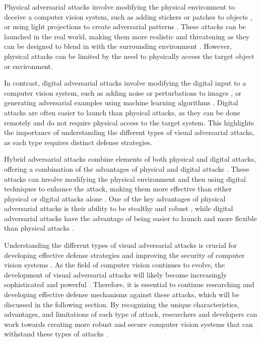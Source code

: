 \documentclass[11pt]{article}
\begin{document}
Physical adversarial attacks involve modifying the physical environment to deceive a computer vision system, such as adding stickers or patches to objects \cite{ref7}, or using light projections to create adversarial patterns \cite{ref8}. These attacks can be launched in the real world, making them more realistic and threatening as they can be designed to blend in with the surrounding environment \cite{ref9}. However, physical attacks can be limited by the need to physically access the target object or environment.

In contrast, digital adversarial attacks involve modifying the digital input to a computer vision system, such as adding noise or perturbations to images \cite{ref1}, or generating adversarial examples using machine learning algorithms \cite{ref10}. Digital attacks are often easier to launch than physical attacks, as they can be done remotely and do not require physical access to the target system. This highlights the importance of understanding the different types of visual adversarial attacks, as each type requires distinct defense strategies.

Hybrid adversarial attacks combine elements of both physical and digital attacks, offering a combination of the advantages of physical and digital attacks \cite{ref11}. These attacks can involve modifying the physical environment and then using digital techniques to enhance the attack, making them more effective than either physical or digital attacks alone \cite{ref12}. One of the key advantages of physical adversarial attacks is their ability to be stealthy and robust \cite{ref13}, while digital adversarial attacks have the advantage of being easier to launch and more flexible than physical attacks \cite{ref14}.

Understanding the different types of visual adversarial attacks is crucial for developing effective defense strategies and improving the security of computer vision systems \cite{ref15}. As the field of computer vision continues to evolve, the development of visual adversarial attacks will likely become increasingly sophisticated and powerful \cite{ref4}. Therefore, it is essential to continue researching and developing effective defense mechanisms against these attacks, which will be discussed in the following section. By recognizing the unique characteristics, advantages, and limitations of each type of attack, researchers and developers can work towards creating more robust and secure computer vision systems that can withstand these types of attacks \cite{ref16}.
\end{document}
